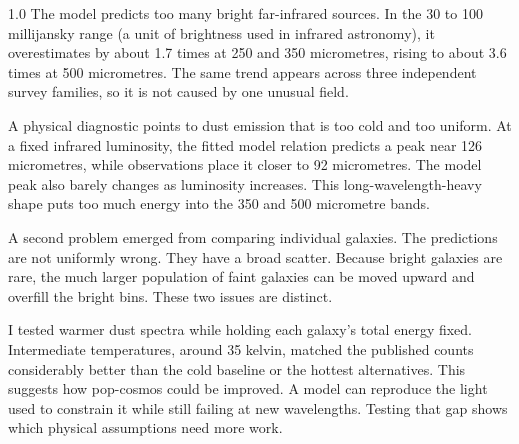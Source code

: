 \documentclass[12pt,a4paper]{article}
\begin{document}
\begin{spacing}{1.0}
The model predicts too many bright far-infrared sources. In the 30 to 100 millijansky
range (a unit of brightness used in infrared astronomy), it overestimates by about 1.7 times at 250 and 350 micrometres, rising to about
3.6 times at 500 micrometres. The same trend appears across three independent survey
families, so it is not caused by one unusual field.

A physical diagnostic points to dust emission that is too cold and too uniform. At a
fixed infrared luminosity, the fitted model relation predicts a peak near 126
micrometres, while observations place it closer to 92 micrometres. The model peak also
barely changes as luminosity increases. This long-wavelength-heavy shape puts too much
energy into the 350 and 500 micrometre bands.

A second problem emerged from comparing individual galaxies. The predictions are not
uniformly wrong. They have a broad scatter. Because bright galaxies are rare, the much
larger population of faint galaxies can be moved upward and overfill the bright bins.
These two issues are distinct.

I tested warmer dust spectra while holding each galaxy's total energy fixed.
Intermediate temperatures, around 35 kelvin, matched the published counts considerably
better than the cold baseline or the hottest alternatives. This suggests how pop-cosmos
could be improved. A model can reproduce the light used to constrain it while still
failing at new wavelengths. Testing that gap shows which physical assumptions need more
work.

\end{spacing}
\restoregeometry
\end{document}
